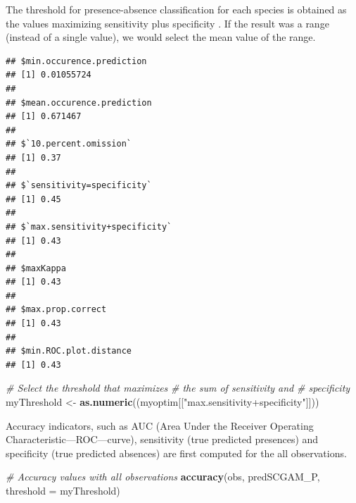 \documentclass[
]{book}
\newenvironment{Shaded}{\begin{snugshade}}{\end{snugshade}}
\newcommand{\AttributeTok}[1]{\textcolor[rgb]{0.13,0.29,0.53}{#1}}
\newcommand{\CommentTok}[1]{\textcolor[rgb]{0.56,0.35,0.01}{\textit{#1}}}
\newcommand{\FunctionTok}[1]{\textcolor[rgb]{0.13,0.29,0.53}{\textbf{#1}}}
\newcommand{\NormalTok}[1]{#1}
\newcommand{\OtherTok}[1]{\textcolor[rgb]{0.56,0.35,0.01}{#1}}
\newcommand{\SpecialCharTok}[1]{\textcolor[rgb]{0.81,0.36,0.00}{\textbf{#1}}}
\newcommand{\StringTok}[1]{\textcolor[rgb]{0.31,0.60,0.02}{#1}}
\begin{document}
The threshold for presence-absence classification for each species is obtained as the values maximizing sensitivity plus specificity \citep{jimenez_etal_2007}. If the result was a range (instead of a single value), we would select the mean value of the range.

\begin{Shaded}
\end{Shaded}

\begin{verbatim}
## $min.occurence.prediction
## [1] 0.01055724
## 
## $mean.occurence.prediction
## [1] 0.671467
## 
## $`10.percent.omission`
## [1] 0.37
## 
## $`sensitivity=specificity`
## [1] 0.45
## 
## $`max.sensitivity+specificity`
## [1] 0.43
## 
## $maxKappa
## [1] 0.43
## 
## $max.prop.correct
## [1] 0.43
## 
## $min.ROC.plot.distance
## [1] 0.43
\end{verbatim}

\begin{Shaded}
\begin{Highlighting}[]
\CommentTok{\# Select the threshold that maximizes}
\CommentTok{\# the sum of sensitivity and}
\CommentTok{\# specificity}
\NormalTok{myThreshold }\OtherTok{\textless{}{-}} \FunctionTok{as.numeric}\NormalTok{((myoptim[[}\StringTok{"max.sensitivity+specificity"}\NormalTok{]]))}
\end{Highlighting}
\end{Shaded}

Accuracy indicators, such as AUC (Area Under the Receiver Operating Characteristic---ROC---curve), sensitivity (true predicted presences) and specificity (true predicted absences) are first computed for the all observations.

\begin{Shaded}
\begin{Highlighting}[]
\CommentTok{\# Accuracy values with all observations}
\FunctionTok{accuracy}\NormalTok{(obs, predSCGAM\_P, }\AttributeTok{threshold =}\NormalTok{ myThreshold)}
\end{Highlighting}
\end{Shaded}
\end{document}
